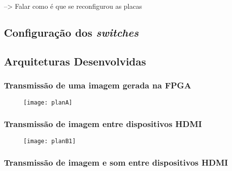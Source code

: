 --> Falar como é que se reconfigurou as placas

\subsection{Configuração dos \textit{switches}}

\subsection{Arquiteturas Desenvolvidas} \label{subsec:HDMIarquiteturas}

\subsubsection{Transmissão de uma imagem gerada na FPGA}

		\begin{figure}[h!]
	\begin{center}
		\leavevmode
		\texttt{[image: planA]}
		\caption{}
		\label{fig:planA}
	\end{center}
\end{figure}

\subsubsection{Transmissão de imagem entre dispositivos HDMI}

		\begin{figure}[h!]
	\begin{center}
		\leavevmode
		\texttt{[image: planB1]}
		\caption{}
		\label{fig:planb1}
	\end{center}
\end{figure}

\subsubsection{Transmissão de imagem e som entre dispositivos HDMI}